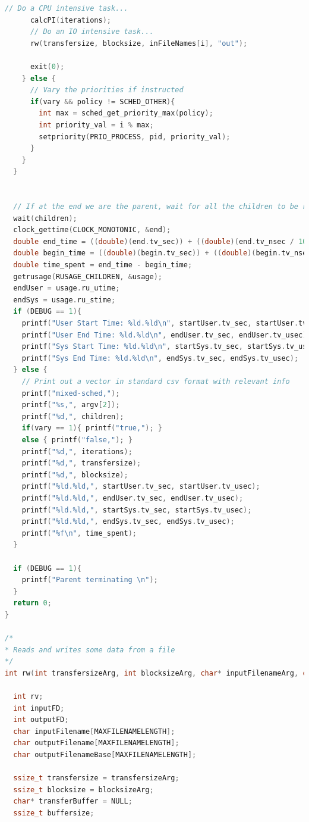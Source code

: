 \documentclass{article}
\begin{document}
\begin{lstlisting}[language=c]
      // Do a CPU intensive task...
      calcPI(iterations);
      // Do an IO intensive task...
      rw(transfersize, blocksize, inFileNames[i], "out");

      exit(0);
    } else {
      // Vary the priorities if instructed
      if(vary && policy != SCHED_OTHER){
        int max = sched_get_priority_max(policy);
        int priority_val = i % max;
        setpriority(PRIO_PROCESS, pid, priority_val);
      }
    }
  }


  // If at the end we are the parent, wait for all the children to be reaped
  wait(children);
  clock_gettime(CLOCK_MONOTONIC, &end);
  double end_time = ((double)(end.tv_sec)) + ((double)(end.tv_nsec / 10000000) / 100); // sec + decimal
  double begin_time = ((double)(begin.tv_sec)) + ((double)(begin.tv_nsec / 10000000) / 100); // sec + decimal
  double time_spent = end_time - begin_time;
  getrusage(RUSAGE_CHILDREN, &usage);
  endUser = usage.ru_utime;
  endSys = usage.ru_stime;
  if (DEBUG == 1){
    printf("User Start Time: %ld.%ld\n", startUser.tv_sec, startUser.tv_usec);
    printf("User End Time: %ld.%ld\n", endUser.tv_sec, endUser.tv_usec);
    printf("Sys Start Time: %ld.%ld\n", startSys.tv_sec, startSys.tv_usec);
    printf("Sys End Time: %ld.%ld\n", endSys.tv_sec, endSys.tv_usec);
  } else {
    // Print out a vector in standard csv format with relevant info
    printf("mixed-sched,");
    printf("%s,", argv[2]);
    printf("%d,", children);
    if(vary == 1){ printf("true,"); }
    else { printf("false,"); }
    printf("%d,", iterations);
    printf("%d,", transfersize);
    printf("%d,", blocksize);
    printf("%ld.%ld,", startUser.tv_sec, startUser.tv_usec);
    printf("%ld.%ld,", endUser.tv_sec, endUser.tv_usec);
    printf("%ld.%ld,", startSys.tv_sec, startSys.tv_usec);
    printf("%ld.%ld,", endSys.tv_sec, endSys.tv_usec);
    printf("%f\n", time_spent);
  }

  if (DEBUG == 1){
    printf("Parent terminating \n");
  }
  return 0;
}

/*
* Reads and writes some data from a file
*/
int rw(int transfersizeArg, int blocksizeArg, char* inputFilenameArg, char* outputFilenameArg){

  int rv;
  int inputFD;
  int outputFD;
  char inputFilename[MAXFILENAMELENGTH];
  char outputFilename[MAXFILENAMELENGTH];
  char outputFilenameBase[MAXFILENAMELENGTH];

  ssize_t transfersize = transfersizeArg;
  ssize_t blocksize = blocksizeArg;
  char* transferBuffer = NULL;
  ssize_t buffersize;


\end{lstlisting}
\end{document}
